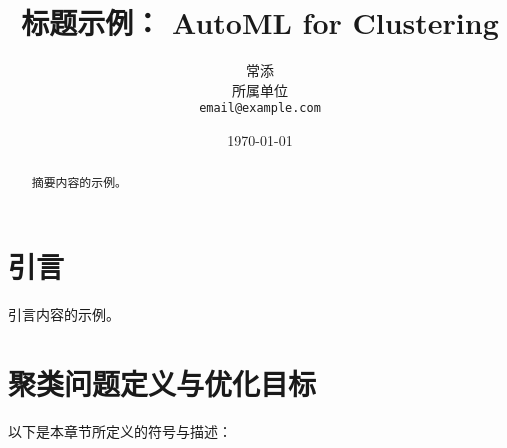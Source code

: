 \documentclass[8pt,twocolumn]{article} %
\numberwithin{equation}{section}
\begin{document}
\title{\textbf{标题示例： AutoML for Clustering}}
\author{常添 \\ 所属单位 \\ \texttt{email@example.com}}
\date{\today}

\maketitle

\begin{abstract}
摘要内容的示例。
\end{abstract}

\section{引言}
引言内容的示例。

\section{聚类问题定义与优化目标}

以下是本章节所定义的符号与描述：
\end{document}
